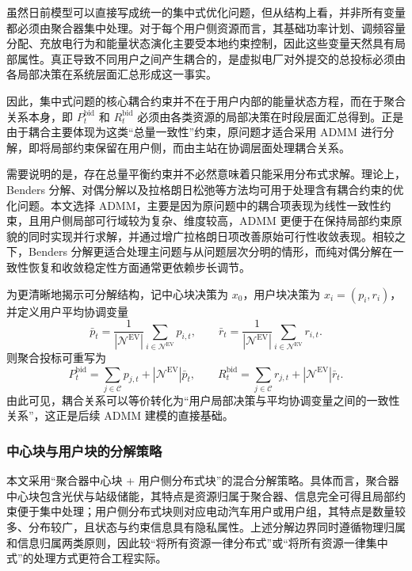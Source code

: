 虽然日前模型可以直接写成统一的集中式优化问题，但从结构上看，并非所有变量都必须由聚合器集中处理。对于每个用户侧资源而言，其基础功率计划、调频容量分配、充放电行为和能量状态演化主要受本地约束控制，因此这些变量天然具有局部属性。真正导致不同用户之间产生耦合的，是虚拟电厂对外提交的总投标必须由各局部决策在系统层面汇总形成这一事实。

因此，集中式问题的核心耦合约束并不在于用户内部的能量状态方程，而在于聚合关系本身，即 $P_t^{\mathrm{bid}}$ 和 $R_t^{\mathrm{bid}}$ 必须由各类资源的局部决策在时段层面汇总得到。正是由于耦合主要体现为这类“总量一致性”约束，原问题才适合采用 ADMM 进行分解，即将局部约束保留在用户侧，而由主站在协调层面处理耦合关系。

需要说明的是，存在总量平衡约束并不必然意味着只能采用分布式求解。理论上，Benders 分解、对偶分解以及拉格朗日松弛等方法均可用于处理含有耦合约束的优化问题。本文选择 ADMM，主要是因为原问题中的耦合项表现为线性一致性约束，且用户侧局部可行域较为复杂、维度较高，ADMM 更便于在保持局部约束原貌的同时实现并行求解，并通过增广拉格朗日项改善原始可行性收敛表现。相较之下，Benders 分解更适合处理主问题与从问题层次分明的情形，而纯对偶分解在一致性恢复和收敛稳定性方面通常更依赖步长调节。

为更清晰地揭示可分解结构，记中心块决策为 $x_0$，用户块决策为 $x_i=(p_i,r_i)$，并定义用户平均协调变量
\begin{equation}
\bar p_t = \frac{1}{|\mathcal{N}^{\mathrm{EV}}|} \sum_{i \in \mathcal{N}^{\mathrm{EV}}} p_{i,t}, \qquad
\bar r_t = \frac{1}{|\mathcal{N}^{\mathrm{EV}}|} \sum_{i \in \mathcal{N}^{\mathrm{EV}}} r_{i,t}.
\end{equation}
则聚合投标可重写为
\begin{equation}
P_t^{\mathrm{bid}} = \sum_{j \in \mathcal{C}} p_{j,t} + |\mathcal{N}^{\mathrm{EV}}| \bar p_t,
\qquad
R_t^{\mathrm{bid}} = \sum_{j \in \mathcal{C}} r_{j,t} + |\mathcal{N}^{\mathrm{EV}}| \bar r_t.
\end{equation}
由此可见，耦合关系可以等价转化为“用户局部决策与平均协调变量之间的一致性关系”，这正是后续 ADMM 建模的直接基础。

\subsubsection{中心块与用户块的分解策略}
\label{subsubsec:vpp_admm_model_algorithm_split}

本文采用“聚合器中心块 + 用户侧分布式块”的混合分解策略。具体而言，聚合器中心块包含光伏与站级储能，其特点是资源归属于聚合器、信息完全可得且局部约束便于集中处理；用户侧分布式块则对应电动汽车用户或用户组，其特点是数量较多、分布较广，且状态与约束信息具有隐私属性。上述分解边界同时遵循物理归属和信息归属两类原则，因此较“将所有资源一律分布式”或“将所有资源一律集中式”的处理方式更符合工程实际。

